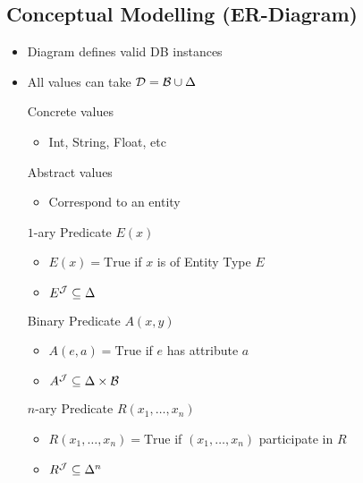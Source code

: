 \subsection{Conceptual Modelling (ER-Diagram)}
\begin{itemize}
        \begin{itemize}
            \item Diagram defines valid DB instances
            \item All values can take $\mathcal{D} = \mathcal{B} \cup \Delta$
                \begin{itemize}
                     Concrete values
                        \begin{itemize}
                            \item Int, String, Float, etc
                        \end{itemize}
                    \ides{$\mathbf{\Delta}$:} Abstract values
                        \begin{itemize}
                            \item Correspond to an entity
                        \end{itemize}
                \end{itemize}
             $1$-ary Predicate $E(x)$
                \begin{itemize}
                    \item $E(x) = \text{True}$ if $x$ is of Entity Type $E$
                    \item $E^\mathcal{J} \subseteq \Delta$
                \end{itemize}
             Binary Predicate $A(x, y)$
                \begin{itemize}
                    \item $A(e, a) = \text{True}$ if $e$ has attribute $a$
                    \item $A^\mathcal{J} \subseteq \Delta \times \mathcal{B}$
                \end{itemize}
             $n$-ary Predicate $R(x_1, \dots, x_n)$
                \begin{itemize}
                    \item $R(x_1, \dots, x_n) = \text{True}$ if $(x_1, \dots, x_n)$ participate in $R$
                    \item $R^\mathcal{J} \subseteq \Delta^n$
                \end{itemize}

\end{itemize}
\end{itemize}
